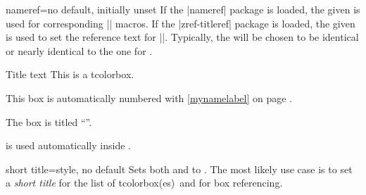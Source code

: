\clearpage
\begin{docTcbKey}[][doc new and updated={2016-06-22}{2023-02-08}]{nameref}{=}{no default, initially unset}
If the |nameref| package is loaded, the given  is used for
corresponding |\nameref| macros.
If the |zref-titleref| package is loaded, the given  is used to
set the reference text for |\ztitleref|.
Typically, the  will be chosen
to be identical or nearly identical to the one for .


\begin{dispExample}
\begin{pabox}[label={mynamelabel},nameref={Title or anything else}]{Title text}
This is a tcolorbox.
\end{pabox}
This box is automatically numbered with \ref{mynamelabel} on page
\pageref{mynamelabel}.

The box is titled \enquote{}.
\end{dispExample}

\begin{marker}
 is used automatically inside .
\end{marker}

\end{docTcbKey}


\begin{docTcbKey}[][doc new=2022-07-18]{short title}{=}{style, no default}
Sets both  and  to .
The most likely use case is to set a \emph{short title} for the
\flqq list of tcolorbox(es)\frqq\ and for box referencing.
\end{docTcbKey}


\clearpage
{}



